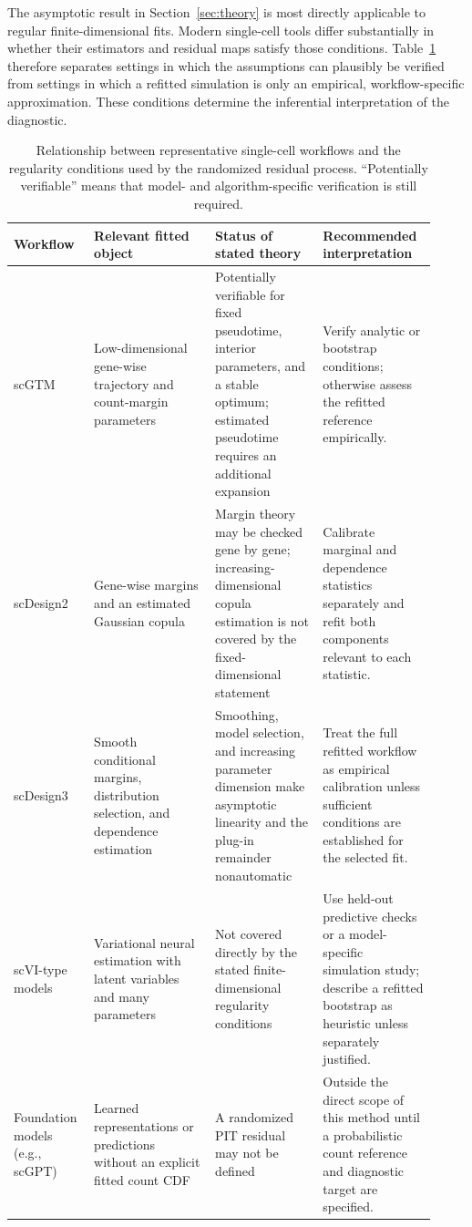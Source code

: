 \documentclass[preprint,12pt]{elsarticle}
\theoremstyle{plain}
\theoremstyle{remark}
\begin{document}
The asymptotic result in Section~\ref{sec:theory} is most directly applicable
to regular finite-dimensional fits. Modern single-cell tools differ
substantially in whether their estimators and residual maps satisfy those
conditions. Table~\ref{tab:tool-regularity} therefore separates settings in
which the assumptions can plausibly be verified from settings in which a
refitted simulation is only an empirical, workflow-specific approximation.
These conditions determine the inferential interpretation of the diagnostic.

\begin{table}[!htbp]
\centering
\scriptsize
\caption{Relationship between representative single-cell workflows and the
regularity conditions used by the randomized residual process. ``Potentially
verifiable'' means that model- and algorithm-specific verification is still
required.}
\label{tab:tool-regularity}
\setlength{\tabcolsep}{3pt}
\begin{tabular}{@{}>{\raggedright\arraybackslash}p{0.16\linewidth}>{\raggedright\arraybackslash}p{0.27\linewidth}>{\raggedright\arraybackslash}p{0.24\linewidth}>{\raggedright\arraybackslash}p{0.25\linewidth}@{}}
\toprule
Workflow & Relevant fitted object & Status of stated theory & Recommended interpretation\\
\midrule
scGTM & Low-dimensional gene-wise trajectory and count-margin parameters & Potentially verifiable for fixed pseudotime, interior parameters, and a stable optimum; estimated pseudotime requires an additional expansion & Verify analytic or bootstrap conditions; otherwise assess the refitted reference empirically.\\
\addlinespace
scDesign2 & Gene-wise margins and an estimated Gaussian copula & Margin theory may be checked gene by gene; increasing-dimensional copula estimation is not covered by the fixed-dimensional statement & Calibrate marginal and dependence statistics separately and refit both components relevant to each statistic.\\
\addlinespace
scDesign3 & Smooth conditional margins, distribution selection, and dependence estimation & Smoothing, model selection, and increasing parameter dimension make asymptotic linearity and the plug-in remainder nonautomatic & Treat the full refitted workflow as empirical calibration unless sufficient conditions are established for the selected fit.\\
\addlinespace
scVI-type models & Variational neural estimation with latent variables and many parameters & Not covered directly by the stated finite-dimensional regularity conditions & Use held-out predictive checks or a model-specific simulation study; describe a refitted bootstrap as heuristic unless separately justified.\\
\addlinespace
Foundation models (e.g., scGPT) & Learned representations or predictions without an explicit fitted count CDF & A randomized PIT residual may not be defined & Outside the direct scope of this method until a probabilistic count reference and diagnostic target are specified.\\
\bottomrule
\end{tabular}
\end{table}
\end{document}
